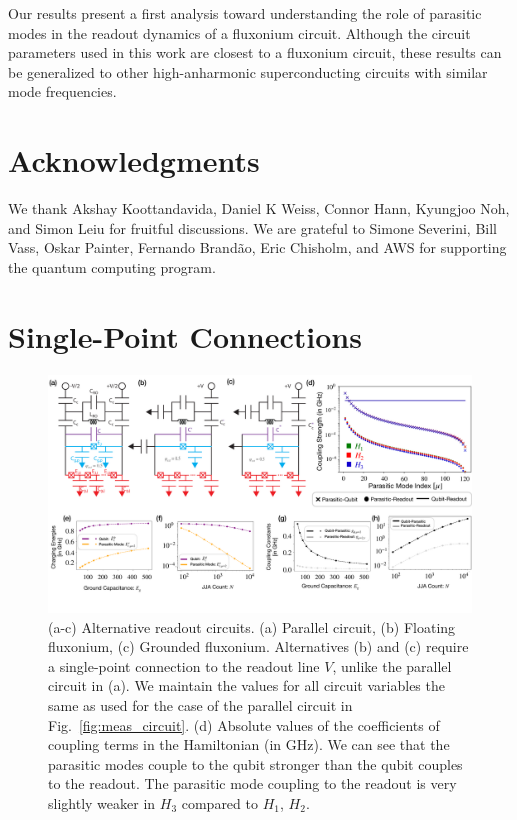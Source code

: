 \documentclass[%
reprint,
superscriptaddress,
 amsmath,amssymb,
 aps,
 prx,
longbibliography,
floatfix,
]{revtex4-2}
\begin{document}
Our results present a first analysis toward understanding the role of parasitic modes in the readout dynamics of a fluxonium circuit. Although the circuit parameters used in this work are closest to a fluxonium circuit, these results can be generalized to other high-anharmonic superconducting circuits with similar mode frequencies.

\section{Acknowledgments}
 We thank Akshay Koottandavida, Daniel K Weiss, Connor Hann, Kyungjoo Noh, and Simon Leiu for fruitful discussions. We are grateful to Simone Severini, Bill Vass, Oskar Painter, Fernando Brand\~ao, Eric Chisholm, and AWS for supporting the quantum computing program. %
\appendix
\section{Single-Point Connections}\label{app:alt_circuits}
\begin{figure}[htb]
    \centering
    \includegraphics[width=\linewidth]{Figures/Circuit_choice.pdf}
    \caption{(a-c) Alternative readout circuits. (a) Parallel circuit, (b) Floating fluxonium, (c) Grounded fluxonium. Alternatives (b) and (c) require a single-point connection to the readout line $V$, unlike the parallel circuit in (a). We maintain the values for all circuit variables the same as used for the case of the parallel circuit in Fig.~\ref{fig:meas_circuit}. (d) Absolute values of the coefficients of coupling terms in the Hamiltonian (in GHz). We can see that the parasitic modes couple to the qubit stronger than the qubit couples to the readout. The parasitic mode coupling to the readout is very slightly weaker in $H_3$ compared to $H_1$, $H_2$.}
    \label{fig:circuit_choice}
\end{figure}
\end{document}
